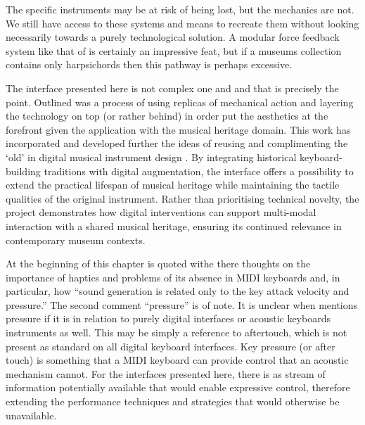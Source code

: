 The specific instruments may be at risk of being lost, but the mechanics are not. We still have access to these systems and means to recreate them without looking necessarily towards a purely technological solution. A modular force feedback system like that of \textcite{cadoz_modular_1990} is certainly an impressive feat, but if a museums collection contains only harpsichords then this pathway is perhaps excessive.

The interface presented here is not complex one and and that is precisely the point. 
Outlined was a process of using replicas of mechanical action and layering the technology on top (or rather behind) in order put the aesthetics at the forefront given the application with the musical heritage domain. This work has incorporated and developed further the ideas of reusing and complimenting the `old' in digital musical instrument design \cite{masu_o-in-nime_2023}. By integrating historical keyboard-building traditions with digital augmentation, the interface offers a possibility to extend the practical lifespan of musical heritage while maintaining the tactile qualities of the original instrument. Rather than prioritising technical novelty, the project demonstrates how digital interventions can support multi-modal interaction with a shared musical heritage, ensuring its continued relevance in contemporary museum contexts.

At the beginning of this chapter \textcite{oboe_mikey_2006} is quoted withe there thoughts on the importance of haptics and problems of its absence in MIDI keyboards and, in particular, how ``sound generation is related only to the key attack velocity and pressure.'' The second comment ``pressure'' is of note. It is unclear when \textcite{oboe_mikey_2006} mentions pressure if it is in relation to purely digital interfaces or acoustic keyboards instruments as well. This may be simply a  reference to aftertouch, which is not present as standard on all digital keyboard interfaces. Key pressure (or after touch) is something that a MIDI keyboard can provide control that an acoustic mechanism cannot. For the interfaces presented here, there is as stream of information potentially available that would enable expressive control, therefore extending the performance techniques and strategies that would otherwise be unavailable. 

